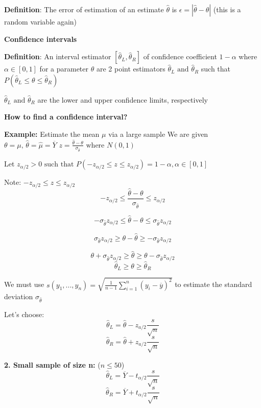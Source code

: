 \documentclass[12pt, letterpaper]{article}
\begin{document}
\textbf{Definition}: The error of estimation of an estimate $\hat{\theta}$ is $\epsilon=|\hat{\theta}-\theta|$ (this is a random variable again)\bigskip

\textbf{Confidence intervals}\bigskip

\textbf{Definition}: An interval estimator $[\hat{\theta}_L, \hat{\theta}_R]$ of confidence coefficient $1-\alpha$ where $\alpha \in[0,1]$ for a parameter $\theta$ are 2 point estimators $\hat{\theta}_L \text{ and }\hat{\theta}_R$ such that $P(\hat{\theta}_L\leq \theta \leq \hat{\theta}_R)$\newline

$\hat{\theta}_L \text{ and } \hat{\theta}_R$ are the lower and upper confidence limits, respectively\newline

\textbf{How to find a confidence interval?}

\textbf{Example:} Estimate the mean $\mu$ via a large sample
We are given $\theta =\mu \text{, }\hat{\theta} = \hat{\mu}=\overline{Y}$
$z=\frac{\hat{\theta}-\theta}{\sigma_{\hat{\theta}}} \text{ where } N(0,1)$

Let $z_{\alpha/2}>0 \text{ such that } P(-z_{\alpha/2}\leq z\leq z_{\alpha/2})= 1-\alpha, \alpha \in [0,1]$

Note: $-z_{\alpha/2}\leq z\leq z_{\alpha/2}$
$$-z_{\alpha/2}\leq \frac{\hat{\theta}-\theta}{\sigma_{\hat{\theta}}}\leq z_{\alpha/2} $$

$$-\sigma_{\hat{\theta}}z_{\alpha/2}\leq \hat{\theta}-\theta \leq \sigma_{\hat{\theta}}z_{\alpha/2} $$

$$\sigma_{\hat{\theta}}z_{\alpha/2}\geq \theta-\hat{\theta} \geq -\sigma_{\hat{\theta}}z_{\alpha/2} $$

$$\theta+\sigma_{\hat{\theta}}z_{\alpha/2}\geq \hat{\theta} \geq \theta-\sigma_{\hat{\theta}}z_{\alpha/2} $$
$$\hat{\theta}_L\geq \theta\geq \hat{\theta}_R$$

We must use $\boxed{s(y_1, ..., y_n)= \sqrt{\frac{1}{n-1} \sum_{i=1}^{n} (y_i-\overline{y})^2}}$ to estimate the standard deviation $\sigma_{\hat{\theta}}$

Let's choose:
$$\hat{\theta}_L=\hat{\theta}-z_{a/2}\frac{s}{\sqrt{n}}$$
$$\hat{\theta}_R=\hat{\theta}+z_{a/2}\frac{s}{\sqrt{n}}$$\pagebreak

\textbf{2. Small sample of size n: }($n\leq50$)\newline
$$\hat{\theta}_L=\overline{Y}-t_{\alpha/2}\frac{s}{\sqrt{n}}$$
$$\hat{\theta}_R=\overline{Y}+t_{\alpha/2}\frac{s}{\sqrt{n}}$$
\end{document}
